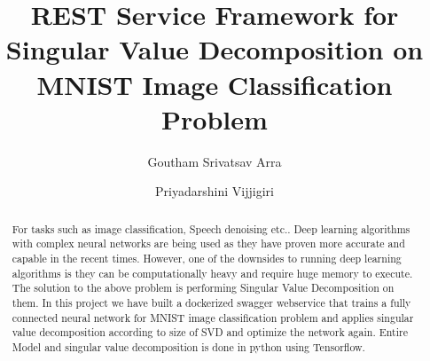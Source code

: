 

\def\paperstatus{100} %
\def\paperchapter{REST} %
\def\hid{hid-sp18-401,hid-sp18-421} %
\def\volume{9} %

\def\locator{\hid, Volume: \volume, Chapter: \paperchapter, Status:
  \paperstatus. \newline}

\title{REST Service Framework for Singular Value Decomposition on MNIST Image Classification Problem}


\author{Goutham Srivatsav Arra}

\author{Priyadarshini Vijjigiri}

\renewcommand{\shortauthors}{G. v. Laszewski}


\begin{abstract} 

For tasks such as image classification, Speech denoising etc.. Deep learning
algorithms with complex  neural networks are being used as they have proven
more accurate and capable in the recent times. However, one of the downsides
to running deep learning algorithms is they can be computationally heavy and
require huge memory to execute. The solution to  the above problem is
performing Singular Value Decomposition on them. In this project we have built
a dockerized swagger webservice  that trains a fully connected neural network
for MNIST image classification problem and applies singular value
decomposition according to size of SVD and optimize the network again. Entire
Model and singular value decomposition is done in  python using Tensorflow.

 \end{abstract}

